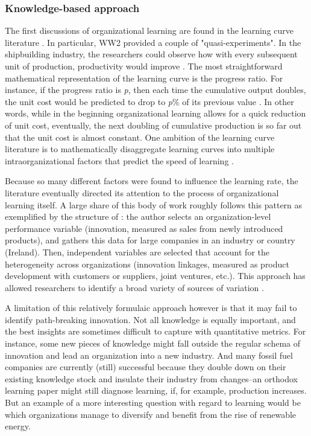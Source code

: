 \subsubsection{Knowledge-based approach}

The first discussions of organizational learning are found in the learning curve literature \citep{Wright1936}. In particular, WW2 provided a couple of "quasi-experiments". In the shipbuilding industry, the researchers could observe how with every subsequent unit of production, productivity would improve \citep{Searle1945}. The most straightforward mathematical representation of the learning curve is the progress ratio. For instance, if the progress ratio is \textit{p}, then each time the cumulative output doubles, the unit cost would be predicted to drop to \textit{p}\% of its previous value \citep[p. 15]{Argote2013-1}. In other words, while in the beginning organizational learning allows for a quick reduction of unit cost, eventually, the next doubling of cumulative production is so far out that the unit cost is almost constant. One ambition of the learning curve literature is to mathematically disaggregate learning curves into multiple intraorganizational factors that predict the speed of learning \citep[e.g.,][]{Arrow1962}.

Because so many different factors were found to influence the learning rate, the literature eventually directed its attention to the process of organizational learning itself. A large share of this body of work roughly follows this pattern as exemplified by the structure of \citet{Love2014}: the author selects an organization-level performance variable (innovation, measured as sales from newly introduced products), and gathers this data for large companies in an industry or country (Ireland). Then, independent variables are selected that account for the heterogeneity across organizations (innovation linkages, measured as product development with customers or suppliers, joint ventures, etc.). This approach has allowed researchers to identify a broad variety of sources of variation \citep[pp. 18ff]{Argote2013-1}.

A limitation of this relatively formulaic approach however is that it may fail to identify path-breaking innovation. Not all knowledge is equally important, and the best insights are sometimes difficult to capture with quantitative metrics. For instance, some new pieces of knowledge might fall outside the regular schema of innovation and lead an organization into a new industry. And many fossil fuel companies are currently (still) successful because they double down on their existing knowledge stock and insulate their industry from changes--an orthodox learning paper might still diagnose learning, if, for example, production increases. But an example of a more interesting question with regard to learning would be which organizations manage to diversify and benefit from the rise of renewable energy.

